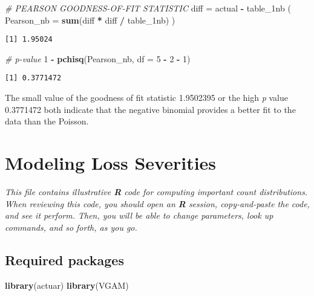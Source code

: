 \documentclass[]{book}
\newenvironment{Shaded}{\begin{snugshade}}{\end{snugshade}}
\newcommand{\KeywordTok}[1]{\textcolor[rgb]{0.13,0.29,0.53}{\textbf{#1}}}
\newcommand{\DataTypeTok}[1]{\textcolor[rgb]{0.13,0.29,0.53}{#1}}
\newcommand{\DecValTok}[1]{\textcolor[rgb]{0.00,0.00,0.81}{#1}}
\newcommand{\StringTok}[1]{\textcolor[rgb]{0.31,0.60,0.02}{#1}}
\newcommand{\CommentTok}[1]{\textcolor[rgb]{0.56,0.35,0.01}{\textit{#1}}}
\newcommand{\OperatorTok}[1]{\textcolor[rgb]{0.81,0.36,0.00}{\textbf{#1}}}
\newcommand{\NormalTok}[1]{#1}
\theoremstyle{definition}
\theoremstyle{definition}
\theoremstyle{definition}
\theoremstyle{remark}
\begin{document}
\begin{Shaded}
\begin{Highlighting}[]
\CommentTok{# PEARSON GOODNESS-OF-FIT STATISTIC}
\NormalTok{diff =}\StringTok{ }\NormalTok{actual }\OperatorTok{-}\StringTok{ }\NormalTok{table_1nb}
\NormalTok{(  }\DataTypeTok{Pearson_nb =} \KeywordTok{sum}\NormalTok{(diff }\OperatorTok{*}\StringTok{ }\NormalTok{diff }\OperatorTok{/}\StringTok{ }\NormalTok{table_1nb) )}
\end{Highlighting}
\end{Shaded}

\begin{verbatim}
[1] 1.95024
\end{verbatim}

\begin{Shaded}
\begin{Highlighting}[]
\CommentTok{# p-value}
\DecValTok{1} \OperatorTok{-}\StringTok{ }\KeywordTok{pchisq}\NormalTok{(Pearson_nb, }\DataTypeTok{df =} \DecValTok{5} \OperatorTok{-}\StringTok{ }\DecValTok{2} \OperatorTok{-}\StringTok{ }\DecValTok{1}\NormalTok{)}
\end{Highlighting}
\end{Shaded}

\begin{verbatim}
[1] 0.3771472
\end{verbatim}

The small value of the goodness of fit statistic 1.9502395 or the high
\emph{p} value 0.3771472 both indicate that the negative binomial
provides a better fit to the data than the Poisson.

\chapter{Modeling Loss Severities}\label{modeling-loss-severities}

\emph{This file contains illustrative \textbf{R} code for computing
important count distributions. When reviewing this code, you should open
an \textbf{R} session, copy-and-paste the code, and see it perform.
Then, you will be able to change parameters, look up commands, and so
forth, as you go. }

\section{Required packages}\label{required-packages}

\begin{Shaded}
\begin{Highlighting}[]
\KeywordTok{library}\NormalTok{(actuar)}
\KeywordTok{library}\NormalTok{(VGAM)}
\end{Highlighting}
\end{Shaded}
\end{document}
